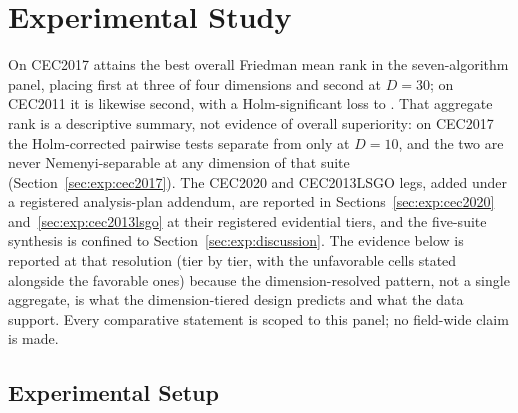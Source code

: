 \section{Experimental Study}\label{sec:experiments}

On CEC2017 \dtgsk{} attains the best overall Friedman
mean rank in the seven-algorithm panel, placing first at three of four
dimensions and second at $D = 30$; on CEC2011 it is likewise second, with
a Holm-significant loss to \egsk{}. That aggregate rank is a descriptive
summary, not evidence of overall superiority: on CEC2017 the Holm-corrected
pairwise tests separate \dtgsk{} from \egsk{} only at $D = 10$, and the two
are never Nemenyi-separable at any dimension of that suite
(Section~\ref{sec:exp:cec2017}). The CEC2020 and CEC2013LSGO legs,
added under a registered analysis-plan addendum, are reported in
Sections~\ref{sec:exp:cec2020} and~\ref{sec:exp:cec2013lsgo} at their
registered evidential tiers, and the five-suite synthesis is confined to
Section~\ref{sec:exp:discussion}. The evidence below is reported at that
resolution (tier by tier, with the unfavorable cells stated alongside
the favorable ones) because the dimension-resolved pattern, not a single
aggregate, is what the dimension-tiered design predicts and what the data
support. Every comparative statement is scoped to this panel; no
field-wide claim is made.

\subsection{Experimental Setup}\label{sec:exp:settings}

